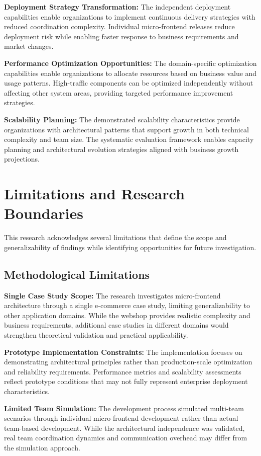 \documentclass[12pt,a4paper]{report}
\begin{document}
\textbf{Deployment Strategy Transformation:} The independent deployment capabilities enable organizations to implement continuous delivery strategies with reduced coordination complexity. Individual micro-frontend releases reduce deployment risk while enabling faster response to business requirements and market changes.

\textbf{Performance Optimization Opportunities:} The domain-specific optimization capabilities enable organizations to allocate resources based on business value and usage patterns. High-traffic components can be optimized independently without affecting other system areas, providing targeted performance improvement strategies.

\textbf{Scalability Planning:} The demonstrated scalability characteristics provide organizations with architectural patterns that support growth in both technical complexity and team size. The systematic evaluation framework enables capacity planning and architectural evolution strategies aligned with business growth projections.

\section{Limitations and Research Boundaries}

This research acknowledges several limitations that define the scope and generalizability of findings while identifying opportunities for future investigation.

\subsection{Methodological Limitations}

\textbf{Single Case Study Scope:} The research investigates micro-frontend architecture through a single e-commerce case study, limiting generalizability to other application domains. While the webshop provides realistic complexity and business requirements, additional case studies in different domains would strengthen theoretical validation and practical applicability.

\textbf{Prototype Implementation Constraints:} The implementation focuses on demonstrating architectural principles rather than production-scale optimization and reliability requirements. Performance metrics and scalability assessments reflect prototype conditions that may not fully represent enterprise deployment characteristics.

\textbf{Limited Team Simulation:} The development process simulated multi-team scenarios through individual micro-frontend development rather than actual team-based development. While the architectural independence was validated, real team coordination dynamics and communication overhead may differ from the simulation approach.
\end{document}
